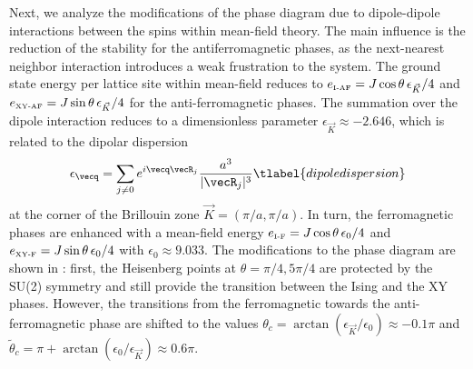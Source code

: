 Next, we analyze the modifications of the phase diagram due to dipole-dipole
interactions between the spins within mean-field theory. The
main influence is the reduction of the stability for the antiferromagnetic
phases, as the next-nearest neighbor interaction introduces a weak frustration
to the system. The ground state energy per lattice site within mean-field
reduces to $ e_{\mbox{\tiny I-AF}} = J \cos \theta \, \epsilon_{\vec K}/4$ and $e_{\mbox{\tiny XY-AF}} = J \sin \theta \, \epsilon_{\vec K}/4$
for the anti-ferromagnetic phases. The summation over the dipole interaction
reduces to a dimensionless parameter $\epsilon_{\vec K} \approx -2.646$, which is related to
the dipolar dispersion
%
\begin{align}
    \epsilon_\vecq = \sum_{j \neq 0} e^{i \vecq \vecR_j }\frac{a^3}{|\vecR_j|^3}
  \tlabel{dipoledispersion}
\end{align}
%
at the corner of the Brillouin zone ${\vec K} = (\pi/a, \pi /a)$.
In turn, the ferromagnetic phases are enhanced with a mean-field energy
$e_{\mbox{\tiny I-F}} = J \cos \theta \, \epsilon_0/4 $ and $ e_{\mbox{\tiny XY-F}} = J \sin \theta \, \epsilon_0/4$
with $\epsilon_{0} \approx 9.033$. The modifications to the
phase diagram are shown in : first, the Heisenberg points at
$\theta = \pi/4, 5 \pi/4$ are protected by the SU(2) symmetry and still
provide the transition between the Ising and the XY phases. However, the
transitions from the ferromagnetic towards the anti-ferromagnetic phase are
shifted to the values $\theta_{c}= \arctan(\epsilon_{\vec K}/\epsilon_{0})
\approx -0.1 \pi$ and $\tilde{\theta}_c = \pi+ \arctan(\epsilon_{0}/\epsilon_{\vec K})\approx 0.6 \pi$.


